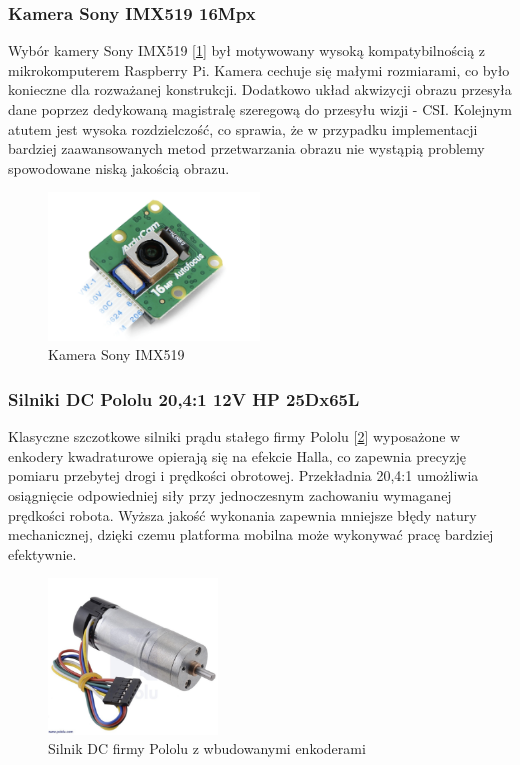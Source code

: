 \subsubsection*{Kamera Sony IMX519 16Mpx}
Wybór kamery Sony IMX519 [\ref{zdj:kamera-sony}] był motywowany wysoką kompatybilnością z mikrokomputerem Raspberry Pi. Kamera cechuje się małymi rozmiarami, co było konieczne dla rozważanej konstrukcji. Dodatkowo układ akwizycji obrazu przesyła dane poprzez dedykowaną magistralę szeregową do przesyłu wizji - CSI. Kolejnym atutem jest wysoka rozdzielczość, co sprawia, że w przypadku implementacji bardziej zaawansowanych metod przetwarzania obrazu nie wystąpią problemy spowodowane niską jakością obrazu. 

\begin{figure}[H]
        \centering
        \includegraphics[width=0.5\textwidth]{./graf/kamera-sony.png}
        \caption{Kamera Sony IMX519}
        \label{zdj:kamera-sony}
\end{figure}

\subsubsection*{Silniki DC Pololu 20,4:1 12V HP 25Dx65L}
Klasyczne szczotkowe silniki prądu stałego firmy Pololu [\ref{zdj:silnik-pololu}] wyposażone w enkodery kwadraturowe opierają się na efekcie Halla, co zapewnia precyzję pomiaru przebytej drogi i prędkości obrotowej. Przekładnia 20,4:1 umożliwia osiągnięcie odpowiedniej siły przy jednoczesnym zachowaniu wymaganej prędkości robota. Wyższa jakość wykonania zapewnia mniejsze błędy natury mechanicznej, dzięki czemu platforma mobilna może wykonywać pracę bardziej efektywnie. 

\begin{figure}[H]
        \centering
        \includegraphics[width=0.4\textwidth]{./graf/silnik-pololu.png}
        \caption{Silnik DC firmy Pololu z wbudowanymi enkoderami}
        \label{zdj:silnik-pololu}
\end{figure}

